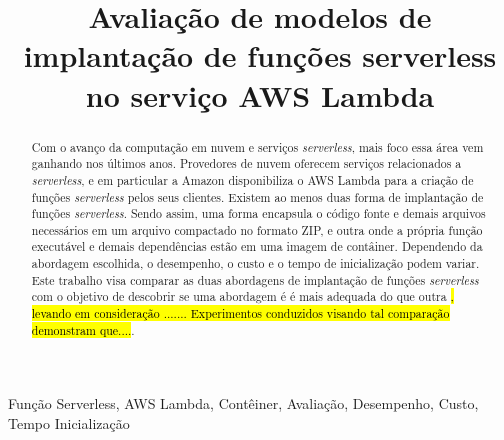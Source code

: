 \documentclass[conference]{IEEEtran}
\begin{document}

\title{Avaliação de modelos de implantação de funções serverless no serviço AWS Lambda}

\author{
\and
{}
}

\maketitle

\begin{abstract}
Com o avanço da computação em nuvem e serviços \textit{serverless}, mais foco essa área vem ganhando nos últimos anos. Provedores de nuvem oferecem serviços relacionados a \textit{serverless}, e em particular a Amazon disponibiliza o AWS Lambda para a criação de funções \textit{serverless} pelos seus clientes. Existem ao menos duas forma de implantação de funções \textit{serverless}. Sendo assim, uma forma encapsula o código fonte e demais arquivos necessários em um arquivo compactado no formato ZIP, e outra onde a própria função executável e demais dependências estão em uma imagem de contâiner. Dependendo da abordagem escolhida, o desempenho, o custo e o tempo de inicialização podem variar. Este trabalho visa comparar as duas abordagens de implantação de funções \textit{serverless} com o objetivo de descobrir se uma abordagem é é mais adequada do que outra \hl{, levando em consideração ....... Experimentos conduzidos visando tal comparação demonstram que....}. 
\end{abstract}

\begin{IEEEkeywords}
Função Serverless, AWS Lambda, Contêiner, Avaliação, Desempenho, Custo, Tempo Inicialização
\end{IEEEkeywords}
\end{document}
